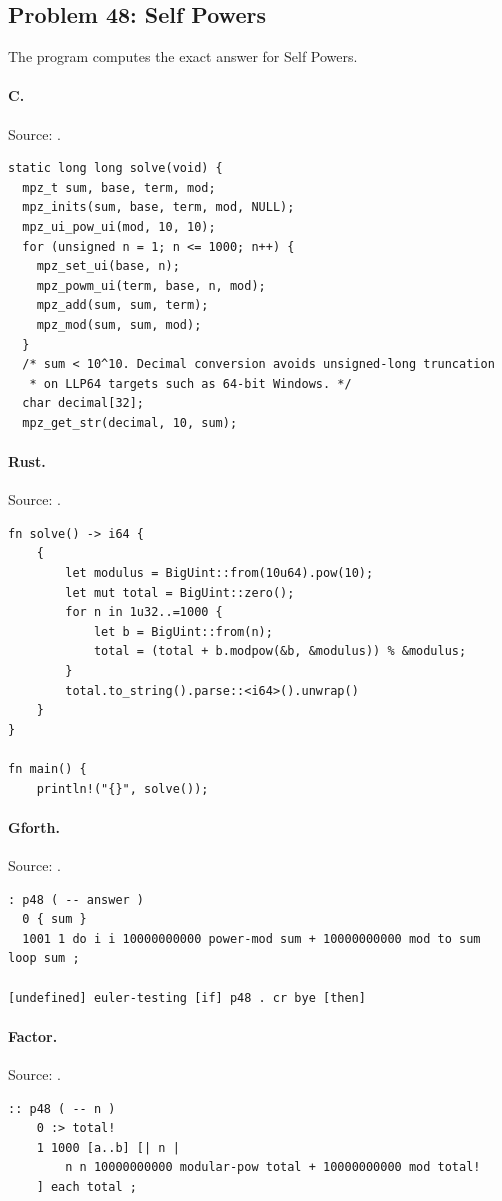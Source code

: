 \subsection{Problem 48: Self Powers}
\label{walkthrough:p48}
The program computes the exact answer for Self Powers.

\paragraph{C.} Source: .
\begin{lstlisting}
static long long solve(void) {
  mpz_t sum, base, term, mod;
  mpz_inits(sum, base, term, mod, NULL);
  mpz_ui_pow_ui(mod, 10, 10);
  for (unsigned n = 1; n <= 1000; n++) {
    mpz_set_ui(base, n);
    mpz_powm_ui(term, base, n, mod);
    mpz_add(sum, sum, term);
    mpz_mod(sum, sum, mod);
  }
  /* sum < 10^10. Decimal conversion avoids unsigned-long truncation
   * on LLP64 targets such as 64-bit Windows. */
  char decimal[32];
  mpz_get_str(decimal, 10, sum);
\end{lstlisting}

\paragraph{Rust.} Source: .
\begin{lstlisting}
fn solve() -> i64 {
    {
        let modulus = BigUint::from(10u64).pow(10);
        let mut total = BigUint::zero();
        for n in 1u32..=1000 {
            let b = BigUint::from(n);
            total = (total + b.modpow(&b, &modulus)) % &modulus;
        }
        total.to_string().parse::<i64>().unwrap()
    }
}

fn main() {
    println!("{}", solve());
\end{lstlisting}

\paragraph{Gforth.} Source: .
\begin{lstlisting}
: p48 ( -- answer )
  0 { sum }
  1001 1 do i i 10000000000 power-mod sum + 10000000000 mod to sum loop sum ;

[undefined] euler-testing [if] p48 . cr bye [then]
\end{lstlisting}

\paragraph{Factor.} Source: .
\begin{lstlisting}
:: p48 ( -- n )
    0 :> total!
    1 1000 [a..b] [| n |
        n n 10000000000 modular-pow total + 10000000000 mod total!
    ] each total ;
\end{lstlisting}

